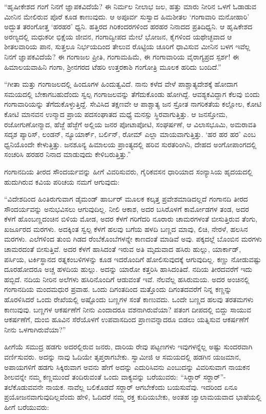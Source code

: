  “ಹೃಷೀಕೇಶದ ಗಂಗೆ ನಿನಗೆ ಜ್ಞಾಪಕವಿದೆಯೆ? ಈ ನಿರ್ಮಲ ನೀಲಾಭ ಜಲ, ಹತ್ತು ಮಾರು ನೀರಿನ ಒಳಗೆ ಓಡಾಡುವ ಮೀನಿನ ಮೇಲಿರುವ ಪೊರೆ ಕೂಡ ಕಾಣುವುದು. ಆ ಅಪೂರ್ವ ಸುಸ್ವಾದ ಹಿಮಶೀತಲ ‘ಗಂಗಾವಾರಿ ಮನೋಹಾರಿ’ ಅದ್ಭುತ ತರಂಗೋತ್ತ ‘ಹರಹರ’ ಧ್ವನಿ. ಹತ್ತಿರದ ಗಿರಿಕಂದರಗಳಿಂದ ಹರಹರ ನಿನಾದದ ಪ್ರತಿದಿಧ್ವನಿ. ಆ ಹೃಷಿಕೇಶದ ಅರಣ್ಯದಲ್ಲಿ ಮಧುಕರೀ ಭಿಕ್ಷೆಯ ಜೀವನ, ಗಂಗಾದ್ವೀಪದ ಮೇಲೆ ಭೋಜನ, ಕೈಗಳಿಂದ ಯಥೇಚ್ಛವಾದ ಆ ಶೀತಲವಾರಿಯ ಪಾನ, ಸುತ್ತಲೂ ನಿರ್ಭಯದಿಂದ ತೇಲುವ ರೊಟ್ಟಿಯ ಚೂರಿಗೆ ಧಾವಿಸುವ ಮೀನಿನ ಬಳಗ ಇವೆಲ್ಲ ನಿನಗೆ ಜ್ಞಾಪಕವಿದೆಯೆ? ಈ ಗಂಗಾಜಲ ಪ್ರೀತಿ, ಗಂಗಾಮಹಿಮೆ, ಈ ಗಂಗಾವಾರಿಯ ವೈರಾಗ್ಯಪ್ರದ ಸ್ಪರ್ಶ! ಈ ಹಿಮಾಲಯವಾಹಿನಿ ಗಂಗಾ, ಶ‍್ರೀನಗರದ ಟೆಹರಿ ಉತ್ತರಕಾಶಿ ಗಂಗೋತ್ರಿ ಮೂಲಕ ಹರಿದು ಬಂದಿದೆ.” 

 “ಗೀತಾ ಮತ್ತು ಗಂಗಾಜಲದಲ್ಲಿ ಹಿಂದೂಗಳ ಹಿಂದುತ್ವವಿದೆ. ನಾನು ಕಳೆದ ವೇಳೆ ಪಾಶ್ಚಾತ್ಯದೇಶಕ್ಕೆ ಹೋದಾಗ ಸಮಯದಲ್ಲಿ ಬೇಕಾಗಬಹುದೆಂದು ಸ್ವಲ್ಪ ಗಂಗಾಜಲವನ್ನು ತೆಗೆದುಕೊಂಡು ಹೋಗಿದ್ದೆ. ಆವಶ್ಯಕವಿದ್ದಾಗ ಕೆಲವು ಬಿಂದು ಗಂಗಾವಾರಿಯನ್ನು ತೆಗೆದುಕೊಳ್ಳುತ್ತಿದ್ದೆ. ಸೇವಿಸಿದ ತಕ್ಷಣವೇ ಆ ಪಾಶ್ಚಾತ್ಯ ಜನ ಸ್ರೋತ ನಾಗರಿಕತೆಯ ಕಲ್ಲೋಲ, ಕೋಟಿ ಕೋಟಿ ಮಾನವನ ಉನ್ಮಾದ ಪ್ರಾಯ ಪದಸಂಘಾತದ ಮಧ್ಯೆ ಮನಸ್ಸು ಸ್ಥಿರವಾಗುತ್ತಿತ್ತು. ಆ ಜನಸ್ತೋಮ, ರಜೋಗುಣೋನ್ಮಾದ, ಹೆಜ್ಜೆ ಹೆಜ್ಜೆಗೆ ಅಲ್ಲಿಯ ಜನರ ಪೋಟಾಪೋಟಿ, ಸಂಘರ್ಷಣೆ, ಆ ವಿಲಾಸಭೂಮಿ, ಅಮರಾವತಿ ಸದೃಶ ಪ್ಯಾರಿಸ್, ಲಂಡನ್, ನ್ಯೂಯಾರ್ಕ್, ಬರ್ಲಿನ್, ರೋಮ್ ಎಲ್ಲಾ ಮಾಯವಾಗುತ್ತಿತ್ತು. ‘ಹರ ಹರ ಹರ’ ಎಂಬ ಧ್ವನಿಯೊಂದೇ ಕೇಳುತ್ತಿತ್ತು. ಜನಶೂನ್ಯ ಹಿಮಾಲಯ ಪ್ರಾಂತ್ಯದಲ್ಲಿ ಹರಿವ ಸುರತರಿಂಗಿನಿ, ದೇಹದ ಅಂಗೋಪಾಂಗದಲ್ಲಿ ಸಂಚರಿಸಿ ಹರಹರ ನಿನಾದ ಮಾಡುವುದು ಕೇಳಿಬರುತ್ತಿತ್ತು.” 

 ಗಂಗಾನದಿಯ ತೀರದ ಸೌಂದರ್ಯವನ್ನು ಹೀಗೆ ವಿವರಿಸುವರು, ಗೈರಿಕವಸನ ಧಾರಿಯಾದ ಸಂನ್ಯಾಸಿಯ ಹೃದಯದಲ್ಲಿ ಹುದುಗಿರುವ ಕವಿಯ ಪರಿಚಯ ನಮಗೆ ಆಗುವುದು: 

 “ವಿದೇಶದಿಂದ ಹಿಂತಿರುಗುವಾಗ ಡೈಮಂಡ್ ಹಾರ್ಬರ್ ಮೂಲಕ ಕಲ್ಕತ್ತ ಪ್ರವೇಶಮಾಡಿದಲ್ಲದೆ ಗಂಗಾನದಿ ತೀರದ ಸೌಂದರ್ಯವನ್ನು ಅನುಭವಿಸಲು ಆಗುವುದಿಲ್ಲ. ನೀಲಿ ಆಕಾಶ, ಅದರ ಬಸಿರೊಳಗೆ ಕಾರ್ಮೋಡಗಳ ತಂಡ, ಅದರ ಕೆಳಗೆ ಹೊಂಬಣ್ಣದಂಚಿನ ಬಿಳಿಯ ಮೋಡ, ಅದರ ಕೆಳಗೆ ಗರಿಗೆದರಿ ನೂರಾರು ಚಾಮರಗಳಂತೆ ಬೀಸುತ್ತಿರುವ ತೆಂಗು, ಖರ್ಜೂರದ ಮರಗಳು. ಅದಕ್ಕಿಂತ ಸ್ವಲ್ಪ ಕೆಳಗೆ ಹಲವು ಬಗೆಯ ಹಳದಿ ಬಣ್ಣದ ಮಾವು, ಲಿಚಿ, ನೇರಳೆ, ಹಲಸಿನ ಮರಗಳು. ಎಲೆಗಳಿಂದ ತುಂಬಿ ಗಿಡದ ರೆಂಬೆಕೊಂಬೆಗಳನ್ನೇ ಕಾಣದಂತೆ ಮಾಡಿವೆ ಅವು. ಪಕ್ಕದಲ್ಲೆ ಬೊಂಬಿನ ಮರಗಳು ಚಾಮರದಂತೆ ಬೀಸುತ್ತಿವೆ. ಅದರ ಕೆಳಗೆ ಹಾಸಿದಂತೆ ಇರುವ ಅತಿ ಮೃದುವಾದ ಹಸಿರು ಹುಲ್ಲು, ಯಾರ್ಕಾಡ್, ಪರ್ಸಿಯ, ಟರ್ಕಿಸ್ಥಾನದ ರತ್ನಕಂಬಳಿಗಳನ್ನು ಕೂಡ ಇದರೊಂದಿಗೆ ಹೋಲಿಸುವುದಕ್ಕೆ ಆಗುವುದಿಲ್ಲ. ಕಣ್ಣು ನೋಡುವಷ್ಟು ದೂರಹೋದರೂ ಅಚ್ಚ ಹಳದಿಯ ಹುಲ್ಲು. ಅದನ್ನು ಯಾರೋ ಕತ್ತರಿಸಿ ಹಾಸಿದಂತಿದೆ. ನದಿಯ ತೀರದವರೆಗೆ ಇದು ಹಬ್ಬಿದೆ. ನದಿಯ ನೀರಿನ ಅಲೆಗಳು ಹಸಿರಿನೊಂದಿಗೆ ಆಡುವಂತೆ ಇವೆ. ನೆಲವೆಲ್ಲ ಹಸಿರುಮಯ. ಅದರ ಅಂಚಿನಲ್ಲಿ ಗಂಗಾನದಿಯ ಮಂದಮಧುರ ಪ್ರವಾಹ. ಒಂದು ದಿಗಂತದಿಂದ ಮತ್ತೊಂದು ದಿಗಂತದವರೆಗೆ ನಿನ್ನ ಕಣ್ಣನ್ನು ಹೊರಳಿಸಿದರೆ ಒಂದು ರೇಖೆಯಲ್ಲಿ ಅಷ್ಟೊಂದು ಬಣ್ಣಗಳ ಸಂತೆ ಕಾಣುವದು. ಒಂದೇ ಬಣ್ಣದ ಹಲವು ತರತಮಗಳು ಕಾಣುವುವು. ಬಣ್ಣಗಳ ಆಕರ್ಷಣೆಗೆ ನೀನು ಎಂದಾದರೂ ವಶನಾಗಿರುವೆಯಾ? ಪತಂಗ ದೀಪದಲ್ಲಿ ಬಿದ್ದು ಸಾಯುವ ಆಕರ್ಷಣೆಗೆ, ದುಂಬಿ ಹೂವಿನ ಸೆರೆಯೊಳಗೆ ಉಪವಾಸದಿಂದ ಪ್ರಾಣವನ್ನಾದರೂ ಬಿಡಲು ಯತ್ನಿಸುವ ಆಕರ್ಷಣೆಗೆ ನೀನು ಒಳಗಾಗಿರುವೆಯಾ?” 

 ಹೀಗೆಯೆ ಸಮುದ್ರ ಹಡಗು ಅದರಲ್ಲಿರುವ ಜನರು, ದಾರಿಯ ರೇವು ಪಟ್ಟಣಗಳು ಇವುಗಳನ್ನೆಲ್ಲ ಅಷ್ಟು ಸುಂದರವಾಗಿ ವರ್ಣಿಸುವರು. ಅದನ್ನು ನಾವು ಓದಿಯೇ ತೃಪ್ತರಾಗಬೇಕು. ಸ್ವಾಮೀಜಿ ಆ ಸಮಯದಲ್ಲಿ ಹಡಗಿನ ಯಜಮಾನ, ಅಪಾಯಗಳಿಗೆ ಹಡಗು ಸಿಕ್ಕಿರುವಾಗ ಅವನು ಹೇಗೆ ಅದನ್ನು ಎದುರಿಸಿವನು ಎಂಬುದನ್ನು ವಿವರಿಸುವಾಗ ನಾಯಕನ ಶೀಲವನ್ನೇ ನಮ್ಮ ಕಣ್ಣಮುಂದೆ ತಂದಿರುವಂತೆ ಒಂದು ವಾಕ್ಯವನ್ನು ಬರೆಯುವರು: “ಸಿರ್‍ದಾರ್ ಸರ್‍ದಾರ್”- ತಲೆಕೊಡುವವನೇ ನಾಯಕ. ನಾವೆಲ್ಲ ಬಲಿಕೊಡದೆ ಸರ್‍ದಾರ್ ಆಗಬೇಕೆಂದು ಬಯಸುವೆವು. ಇದರಿಂದ ಏನೂ ಪ್ರಯೋಜನವಾಗುವುದಿಲ್ಲವೆಂದು ಹೇಳಿ, ಓದಿದರೆ ನಮ್ಮ ರಕ್ತ ಕುದಿಯಬೇಕು, ಅಂತಹ ಜ್ವಾಲಾಮಯವಾದ ಭಾಷೆಯಲ್ಲಿ ಹೀಗೆ ಬರೆಯುವರು: 

